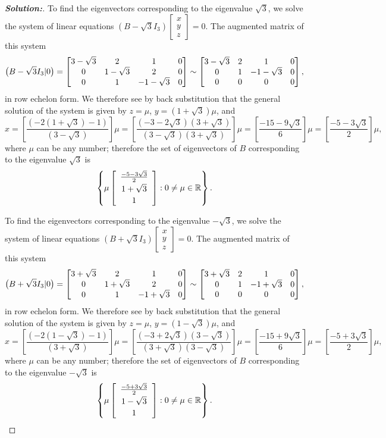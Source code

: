 \documentclass[a4paper]{amsart}
\theoremstyle{definition}
\newenvironment{solution}{\begin{proof}[\textbf{Solution:}] \vphantom{u}}{\end{proof}}
\begin{document}
\begin{solution}
 To find the eigenvectors corresponding to the eigenvalue
 $\sqrt{3}$, we solve the system of linear equations $(B -
 \sqrt{3}I_3)\left[
 \begin{array}{c}x \\ y\\z
 \end{array} \right] = 0$. The augmented matrix of this system
 $$
 \big(B - \sqrt{3}I_3|0\big) = \left[\begin{matrix} 3-\sqrt{3}& 2&
 1&0\\0&1-\sqrt{3}&2&0\\0&1&-1-\sqrt{3}&0\end{matrix}\right] \sim
 \left[\begin{matrix} 3-\sqrt{3}& 2&
 1&0\\0&1&-1-\sqrt{3}&0\\0&0&0&0\end{matrix}\right],
 $$
 in row echelon form. We therefore see by back substitution that
 the general solution of the system is given by $z = \mu$, $y =
 (1+\sqrt{3})\mu$, and $${\textstyle x =
 \left[\frac{(-2(1+\sqrt{3})-1)}{(3-\sqrt{3})}\right]\mu =
 \left[\frac{(-3
 -2\sqrt{3})(3+\sqrt{3})}{(3-\sqrt{3})(3+\sqrt{3})}\right]\mu =
 \left[\frac{-15-9\sqrt{3}}{6}\right]\mu =
 \left[\frac{-5-3\sqrt{3}}{2}\right]\mu,}
 $$
 where $\mu$ can be any number; therefore the set of eigenvectors
 of $B$ corresponding to the eigenvalue $\sqrt{3}$ is
 $$
 \left\{ \mu \left[ \begin{array}{c}
 \frac{-5-3\sqrt{3}}{2}\\[2pt]1+\sqrt{3}\\[2pt]1
 \end{array} \right] : 0 \neq \mu \in {\mathbb{R}} \right\}.
 $$

 To find the eigenvectors corresponding to the eigenvalue
 $-\sqrt{3}$, we solve the system of linear equations $(B +
 \sqrt{3}I_3)\left[
 \begin{array}{c}x \\ y\\z
 \end{array} \right] = 0$. The augmented matrix of this system
 $$
 \big(B + \sqrt{3}I_3|0\big) = \left[\begin{matrix} 3+\sqrt{3}& 2&
 1&0\\0&1+\sqrt{3}&2&0\\0&1&-1+\sqrt{3}&0\end{matrix}\right] \sim
 \left[\begin{matrix} 3+\sqrt{3}& 2&
 1&0\\0&1&-1+\sqrt{3}&0\\0&0&0&0\end{matrix}\right],
 $$
 in row echelon form. We therefore see by back substitution that
 the general solution of the system is given by $z = \mu$, $y =
 (1-\sqrt{3})\mu$, and $${\textstyle x =
 \left[\frac{(-2(1-\sqrt{3})-1)}{(3+\sqrt{3})}\right]\mu =
 \left[\frac{(-3
 +2\sqrt{3})(3-\sqrt{3})}{(3+\sqrt{3})(3-\sqrt{3})}\right]\mu =
 \left[\frac{-15+9\sqrt{3}}{6}\right]\mu =
 \left[\frac{-5+3\sqrt{3}}{2}\right]\mu,}
 $$
 where $\mu$ can be any number; therefore the set of eigenvectors
 of $B$ corresponding to the eigenvalue $-\sqrt{3}$ is
 $$
 \left\{ \mu \left[ \begin{array}{c}
 \frac{-5+3\sqrt{3}}{2}\\[2pt]1-\sqrt{3}\\[2pt]1
 \end{array} \right] : 0 \neq \mu \in {\mathbb{R}} \right\}.
 $$
\end{solution}
\end{document}
